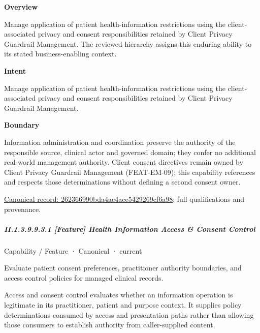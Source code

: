 \textbf{Overview}



Manage application of patient health-information restrictions using the client-associated privacy and consent responsibilities retained by Client Privacy Guardrail Management. The reviewed hierarchy assigns this enduring ability to its stated business-enabling context.



\textbf{Intent}



Manage application of patient health-information restrictions using the client-associated privacy and consent responsibilities retained by Client Privacy Guardrail Management.



\textbf{Boundary}



Information administration and coordination preserve the authority of the responsible source, clinical actor and governed domain; they confer no additional real-world management authority. Client consent directives remain owned by Client Privacy Guardrail Management (FEAT-EM-09); this capability references and respects those determinations without defining a second consent owner.


{\footnotesize \href{../../../../../../../continuum/strategy/capability/262366990bda4ac4ace5429269cf6a98.md}{Canonical record: 262366990bda4ac4ace5429269cf6a98}; full qualifications and provenance.}\par
\subparagraph*{II.1.3.9.9.3.1 [Feature] Health Information Access \& Consent Control}
\label{navigation:II.1.3.9.9.3.1}

\label{element:e2643fa59303401abb1b778f3295e536}
{\small Capability / Feature · Canonical · current}\par

Evaluate patient consent preferences, practitioner authority boundaries, and access control policies for managed clinical records.



Access and consent control evaluates whether an information operation is legitimate in its practitioner, patient and purpose context. It supplies policy determinations consumed by access and presentation paths rather than allowing those consumers to establish authority from caller-supplied content.


